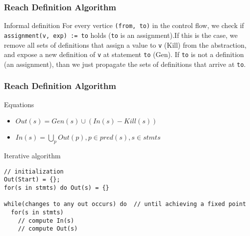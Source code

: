 
\begin{frame}
  \frametitle{Reach Definition Algorithm}

  \begin{block}{Informal definition}
   For every vertice \texttt{(from, to)} in the control flow,
   we check if \texttt{assignment(v, exp) := to} holds (\texttt{to} is
   an assignment).\pause If this is the case, we remove all sets of  definitions that
   assign a value to \texttt{v} ({\color{blue}Kill}) from the abstraction, and expose a new
   definition of \texttt{v} at statement \texttt{to} ({\color{blue}Gen}).
   If \texttt{to} is not a definition (an assignment), than we just propagate the
   sets of definitions that arrive at \texttt{to}.
  \end{block} 
\end{frame}

\begin{frame}[fragile]
  \frametitle{Reach Definition Algorithm}

  \begin{block}{Equations}
    \begin{itemize}
    \item $Out(s) = Gen(s) \cup (In(s) - Kill(s))$  
    \item $In(s) = \bigcup_p Out(p), p \in pred(s), s \in stmts$
    \end{itemize}
  \end{block}

  \pause

\begin{block}{Iterative algorithm}
\begin{small}
\begin{verbatim}
// initialization
Out(Start) = {};
for(s in stmts) do Out(s) = {} 

while(changes to any out occurs) do  // until achieving a fixed point
  for(s in stmts)
    // compute In(s) 
    // compute Out(s)   
\end{verbatim}
\end{small}
\end{block}
\end{frame}



